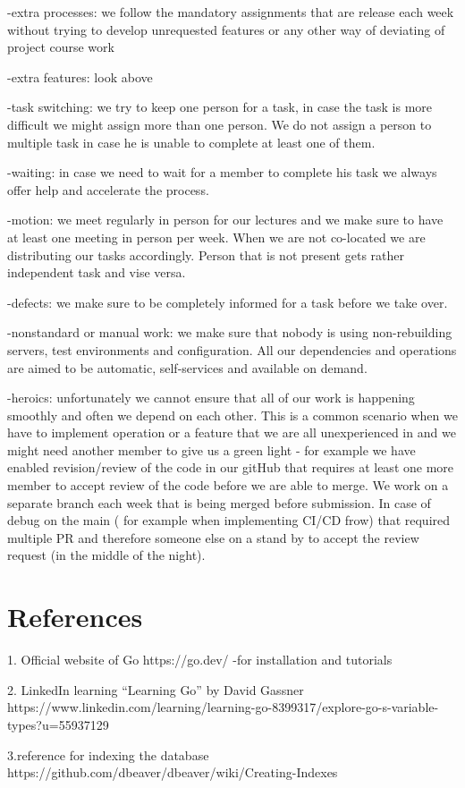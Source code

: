 \documentclass{article}
\begin{document}
\begin{itemize}
-extra processes: we follow the mandatory assignments that are release each week without trying to develop unrequested features or any other way of deviating of project course work

-extra features: look above

-task switching: we try to keep one person for a task, in case the task is more difficult we might assign more than one person. We do not assign a person to multiple task in case he is unable to complete at least one of them.

-waiting: in case we need to wait for a member to complete his task we always offer help and accelerate the process.

-motion: we meet regularly in person for our lectures and we make sure to have at least one meeting in person per week. When we are not co-located we are distributing our tasks accordingly. Person that is not present gets rather independent task and vise versa. 

-defects: we make sure to be completely informed for a task before we take over.

-nonstandard or manual work: we make sure that nobody is using non-rebuilding servers, test environments and configuration. All our dependencies and operations are aimed to be automatic, self-services and available on demand.

-heroics: unfortunately we cannot ensure that all of our work is happening smoothly and often we depend on each other. This is a common scenario when we have to implement operation or a feature that we are all unexperienced in and we might need another member to give us a green light - for example we have enabled revision/review of the code in our gitHub that requires at least one more member to accept review of the code before we are able to merge. We work on a separate branch each week that is being merged before submission. In case of debug on the main ( for example when implementing CI/CD frow) that required multiple PR and therefore someone else on a stand by to accept the review request (in the middle of the night).

\section{References}

1. Official website of Go https://go.dev/
-for installation and tutorials

2. LinkedIn learning “Learning Go” by David Gassner
https://www.linkedin.com/learning/learning-go-8399317/explore-go-s-variable-types?u=55937129

3.reference for indexing the database
https://github.com/dbeaver/dbeaver/wiki/Creating-Indexes


\end{itemize}
\end{document}
